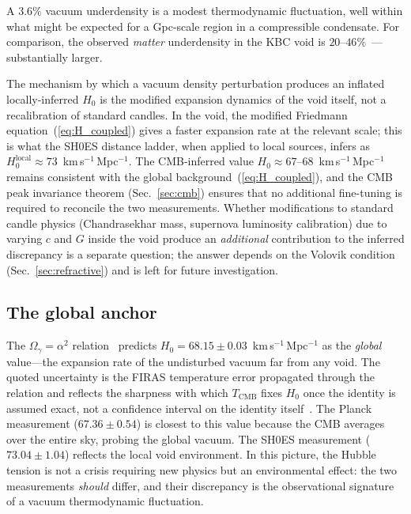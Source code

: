 \documentclass[12pt, a4paper]{article}
\begin{document}
A $3.6\%$ vacuum underdensity is a modest thermodynamic fluctuation, well within what might be expected for a Gpc-scale region in a compressible condensate. For comparison, the observed \emph{matter} underdensity in the KBC void is $20$--$46\%$~\cite{keenan_2013}---substantially larger.

The mechanism by which a vacuum density perturbation produces an inflated locally-inferred $H_0$ is the modified expansion dynamics of the void itself, not a recalibration of standard candles. In the void, the modified Friedmann equation~(\ref{eq:H_coupled}) gives a faster expansion rate at the relevant scale; this is what the SH0ES distance ladder, when applied to local sources, infers as $H_0^{\mathrm{local}} \approx 73$~km\,s$^{-1}$\,Mpc$^{-1}$. The CMB-inferred value $H_0 \approx 67$--$68$~km\,s$^{-1}$\,Mpc$^{-1}$ remains consistent with the global background~(\ref{eq:H_coupled}), and the CMB peak invariance theorem (Sec.~\ref{sec:cmb}) ensures that no additional fine-tuning is required to reconcile the two measurements. Whether modifications to standard candle physics (Chandrasekhar mass, supernova luminosity calibration) due to varying $c$ and $G$ inside the void produce an \emph{additional} contribution to the inferred discrepancy is a separate question; the answer depends on the Volovik condition (Sec.~\ref{sec:refractive}) and is left for future investigation.

\subsection{The global anchor}

The $\Omega_\gamma = \alpha^2$ relation~\cite{kulangiev_2026o} predicts $H_0 = 68.15 \pm 0.03$~km\,s$^{-1}$\,Mpc$^{-1}$ as the \emph{global} value---the expansion rate of the undisturbed vacuum far from any void. The quoted uncertainty is the FIRAS temperature error propagated through the relation and reflects the sharpness with which $T_{\mathrm{CMB}}$ fixes $H_0$ once the identity is assumed exact, not a confidence interval on the identity itself~\cite{kulangiev_2026o}. The Planck measurement ($67.36 \pm 0.54$) is closest to this value because the CMB averages over the entire sky, probing the global vacuum. The SH0ES measurement ($73.04 \pm 1.04$) reflects the local void environment. In this picture, the Hubble tension is not a crisis requiring new physics but an environmental effect: the two measurements \emph{should} differ, and their discrepancy is the observational signature of a vacuum thermodynamic fluctuation.
\end{document}
